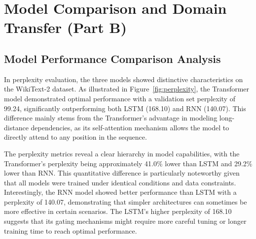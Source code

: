 \documentclass[12pt,oneside]{article}
\begin{document}
\section{Model Comparison and Domain Transfer (Part B)}

\subsection{Model Performance Comparison Analysis}

In perplexity evaluation, the three models showed distinctive characteristics on the WikiText-2 dataset. As illustrated in Figure~\ref{fig:perplexity}, the Transformer model demonstrated optimal performance with a validation set perplexity of 99.24, significantly outperforming both LSTM (168.10) and RNN (140.07). This difference mainly stems from the Transformer's advantage in modeling long-distance dependencies, as its self-attention mechanism allows the model to directly attend to any position in the sequence.


The perplexity metrics reveal a clear hierarchy in model capabilities, with the Transformer's perplexity being approximately 41.0\% lower than LSTM and 29.2\% lower than RNN. This quantitative difference is particularly noteworthy given that all models were trained under identical conditions and data constraints. Interestingly, the RNN model showed better performance than LSTM with a perplexity of 140.07, demonstrating that simpler architectures can sometimes be more effective in certain scenarios. The LSTM's higher perplexity of 168.10 suggests that its gating mechanisms might require more careful tuning or longer training time to reach optimal performance.
\end{document}
